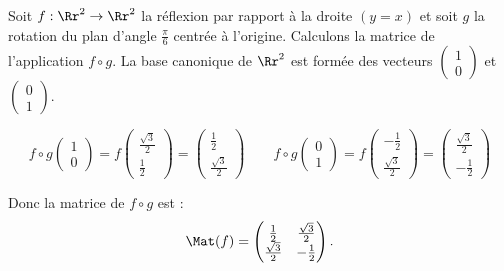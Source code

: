 \documentclass[class=report,crop=false]{standalone}
\begin{document}
\begin{exemple}
Soit $f : \Rr^2 \to \Rr^2$ la réflexion par rapport à la droite $(y=x)$
et soit $g$ la rotation du plan
d'angle $\frac\pi6$ centrée à l'origine.
Calculons la matrice de l'application $f\circ g$.
La base canonique de $\Rr^2$ est formée des vecteurs
$\left(\begin{smallmatrix} 1 \\ 0 \end{smallmatrix} \right)$
et $\left(\begin{smallmatrix} 0 \\ 1 \end{smallmatrix} \right)$.

$$f\circ g \begin{pmatrix} 1 \\ 0 \end{pmatrix}
= f \begin{pmatrix} \frac{\sqrt{3}}{2} \\ \frac12 \end{pmatrix}
= \begin{pmatrix} \frac12 \\ \frac{\sqrt{3}}{2} \end{pmatrix}
\qquad
f\circ g \begin{pmatrix} 0 \\ 1 \end{pmatrix}
= f \begin{pmatrix} - \frac12 \\ \frac{\sqrt{3}}{2}  \end{pmatrix}
= \begin{pmatrix} \frac{\sqrt{3}}{2} \\ -\frac12  \end{pmatrix}$$

Donc la matrice de $f \circ g$ est :
$$\Mat(f) =
\begin{pmatrix}
\frac12 &  \frac{\sqrt{3}}{2} \\
\frac{\sqrt{3}}{2}& -\frac12 \\
\end{pmatrix}.$$

\end{exemple}
\end{document}
